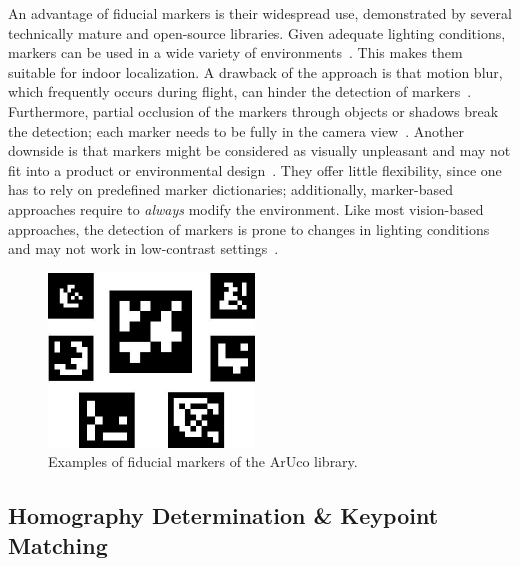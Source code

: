 \documentclass{report}
\begin{document}
An advantage of fiducial markers is their widespread use, demonstrated
by several technically mature and open-source libraries. Given
adequate lighting conditions, markers can be used in a wide variety of
environments~\cite{hornecker2005using}. This makes them suitable for
indoor localization.  A drawback of the approach is that motion blur,
which frequently occurs during flight, can hinder the detection of
markers~\cite{albasiouny2015mean}. Furthermore, partial occlusion of
the markers through objects or shadows break the detection; each
marker needs to be fully in the camera
view~\cite{hornecker2005using}. Another downside is that markers might
be considered as visually unpleasant and may not fit into a product or
environmental design~\cite{chu2013halftone}. They offer little
flexibility, since one has to rely on predefined marker dictionaries;
additionally, marker-based approaches require to \emph{always} modify
the environment. Like most vision-based approaches, the detection of
markers is prone to changes in lighting conditions and may not work in
low-contrast settings~\cite{hornecker2005using}.



\begin{figure}[h!]
\begin{center}
\includegraphics[width=0.252\columnwidth]{markers}
\caption{{\label{fig:aruco}
Examples of fiducial markers of the ArUco library.%
}}
\end{center}
\end{figure}

\subsection{Homography Determination \& Keypoint Matching}
\label{sec:keypointmatching}
\end{document}
